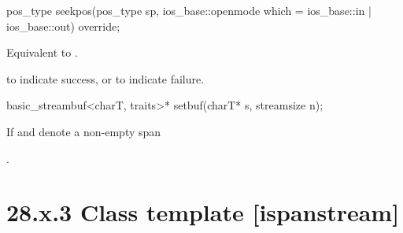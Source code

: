 \documentclass[ebook,11pt,article]{memoir}
\begin{document}
\begin{itemdecl}
pos_type seekpos(pos_type sp,
                 ios_base::openmode which
                   = ios_base::in | ios_base::out) override;
\end{itemdecl}

\begin{itemdescr}
\pnum
\effects
Equivalent to .

\pnum
\returns
{}
to indicate success, or
to indicate failure.
\end{itemdescr}

\begin{itemdecl}
basic_streambuf<charT, traits>* setbuf(charT* s, streamsize n);
\end{itemdecl}

\begin{itemdescr}
\pnum
\effects
If  and  denote a non-empty span

\pnum
\returns
{}.
\end{itemdescr} 

\section{28.x.3 Class template  [ispanstream] }
\end{document}
